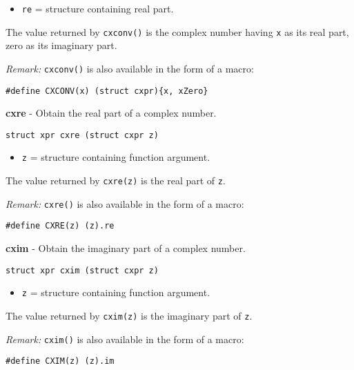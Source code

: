 \documentclass{article}
\begin{document}
\begin{itemize}
\item \texttt{re} = structure containing real part.
\end{itemize}

The value returned by \texttt{cxconv()} is the complex
number having \texttt{x} as its real part, zero
as its imaginary part.

\textit{Remark:}
\texttt{cxconv()} is also available in the form of a macro:

\begin{verbatim}
#define CXCONV(x) (struct cxpr){x, xZero}
\end{verbatim}

\hrulefill{}

\textbf{cxre} - Obtain the real part of a complex number.

\begin{verbatim}
struct xpr cxre (struct cxpr z)
\end{verbatim}

\begin{itemize}
\item \texttt{z} = structure containing function argument.
\end{itemize}

The value returned by \texttt{cxre(z)} is the real part of \texttt{z}.

\textit{Remark:}
\texttt{cxre()} is also available in the form of a macro:

\begin{verbatim}
#define CXRE(z) (z).re
\end{verbatim}

\hrulefill{}

\textbf{cxim} - Obtain the imaginary part of a complex number.

\begin{verbatim}
struct xpr cxim (struct cxpr z)
\end{verbatim}

\begin{itemize}
\item \texttt{z} = structure containing function argument.
\end{itemize}

The value returned by \texttt{cxim(z)} is the imaginary part of \texttt{z}.

\textit{Remark:}
\texttt{cxim()} is also available in the form of a macro:

\begin{verbatim}
#define CXIM(z) (z).im
\end{verbatim}
\end{document}
